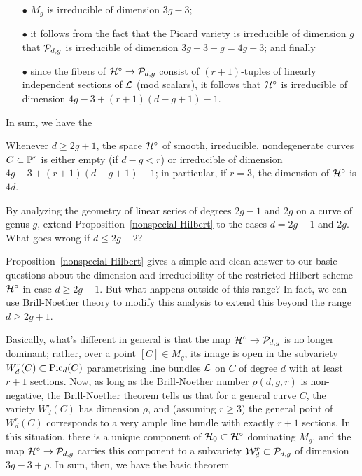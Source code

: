\begin{enumerate}

\item[$\bullet$]  $M_g$ is irreducible of dimension $3g-3$;

\item[$\bullet$] it follows from the fact that the Picard variety is irreducible of dimension $g$ that ${\cal P}_{d,g}$ is irreducible of dimension $3g-3+g = 4g-3$; and finally

\item[$\bullet$] since the fibers of ${\cal H}^\circ \to {\cal P}_{d,g}$ consist of $(r+1)$-tuples of linearly independent sections of ${\mathcal L}$ (mod scalars), it follows that ${\cal H}^\circ$ is irreducible of dimension $4g-3 + (r+1)(d-g+1) - 1$.

\end{enumerate}

In sum, we have the

\begin{proposition}\label{nonspecial Hilbert}
Whenever $d \geq 2g+1$, the space ${\cal H}^\circ$ of smooth, irreducible, nondegenerate curves $C \subset {\mathbb P}^r$ is either empty (if $d-g < r$) or irreducible of dimension $4g-3 + (r+1)(d-g+1) - 1$; in particular, if $r=3$, the dimension of ${\cal H}^\circ$ is $4d$.
\end{proposition}

\begin{exercise}
By analyzing the geometry of linear series of degrees $2g-1$ and $2g$ on a curve of genus $g$, extend Proposition~\ref{nonspecial Hilbert} to the cases $d = 2g-1$ and $2g$. What goes wrong if $d \leq 2g-2$?
\end{exercise}

Proposition~\ref{nonspecial Hilbert} gives a simple and clean answer to our basic questions about the dimension and irreducibility of the restricted Hilbert scheme ${\cal H}^\circ$ in case $d \geq 2g-1$. But what happens outside of this range? In fact, we  can use Brill-Noether theory to modify this analysis to extend this beyond the range $d \geq 2g+1$.

Basically, what's different in general is that the map ${\cal H}^\circ \to {\cal P}_{d,g}$ is no longer dominant; rather, over a point $[C] \in M_g$, its image is open in the subvariety $W^r_d(C) \subset \operatorname{Pic}_d(C)$ parametrizing line bundles ${\mathcal L}$ on $C$ of degree $d$ with at least $r+1$ sections. Now, as long as the Brill-Noether number $\rho(d,g,r)$ is non-negative, the Brill-Noether theorem tells us that for a general curve $C$, the variety $W^r_d(C)$ has dimension $\rho$, and (assuming $r \geq 3$) the general point of $W^r_d(C)$ corresponds to a very ample line bundle with exactly $r+1$ sections. In this situation, there is a unique component of ${\cal H}_0 \subset {\cal H}^\circ$ dominating $M_g$, and the map ${\cal H}^\circ \to {\cal P}_{d,g}$ carries this component to a subvariety ${\cal W}^r_d \subset {\cal P}_{d,g}$ of dimension $3g-3 + \rho$. In sum, then, we have the basic theorem

